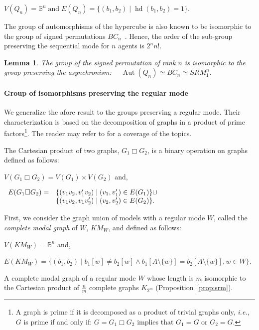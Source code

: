 \documentclass[12pt]{elsarticle}
\newtheorem{lemma}{Lemma}
\newcommand{\Bset}[0]{\mathbb{B}}
\newcommand{\abbrev}[1]{#1, \relax}
\newcommand{\ie}[0]{\abbrev{\textit{i.e.}}}
\newcommand{\aut}[0]{\operatorname{Aut}}
\begin{document}
\medskip
$ V(Q_n)=\Bset^n \;\text{and}\; E(Q_n)=\{(b_1,b_2) \mid \operatorname{hd}(b_1,b_2) = 1 \}.$

\medskip
The group of automorphisms of the hypercube is also known to be isomorphic to the group of signed permutations $BC_n$~\cite{Chen1993}. Hence, the order of the sub-group preserving the sequential mode for $n$ agents is $2^{n}n!$.
\begin{lemma} 
\label{lem:sequential-group}
The group of the signed permutation of rank $n$ is isomorphic to the group preserving the asynchronism: $\quad \aut(Q_n)\simeq BC_n \simeq SRM_1^n.$
\end{lemma}

\paragraph{Group of isomorphisms preserving the regular mode}
We generalize the afore result to the groups preserving a regular mode. Their characterization is based on the decomposition of graphs in a product of prime factors\footnote{A graph is prime if it is decomposed as a product of trivial graphs only, \ie $G$ is prime if and only if: $G = G_1 \Box G_2$ implies that $G_1=G$ or $G_2=G$.}.
 The reader may refer to \cite{Imrich2008, Hammack2011, Sabidussi1959} for a coverage of the topics.

The Cartesian product of two graphs, $G_1 \Box G_2$, is a binary operation on graphs defined as follows:

\medskip
\noindent
$V(G_1 \Box G_2) = V(G_1) \times V(G_2)$ and,

\noindent
$\begin{array}[t]{l l} 
E(G_1 \Box G_2)= &\{ ( v_1v_2,v_1'v_2) \mid (v_1,v_1') \in E(G_1) \} \cup \\		
 					 &\{ ( v_1v_2,v_1v_2') \mid (v_2,v_2') \in E(G_2) \}.
\end{array}$

\medskip

First, we consider the graph union of models with a regular mode $W$, called the \emph{complete modal graph} of $W$, $KM_W$, and defined as follows:

\medskip
\noindent
$V(KM_W)= \Bset^n$ and,

\noindent
$E(KM_W)=\{ (b_1,b_2) \mid b_1[w] \neq b_2[w] \wedge b_1[A \setminus \{w\}]= b_2[A \setminus \{w\}], w \in W \}$.

\medskip
A complete modal graph of a regular mode $W$ whose length is $m$ isomorphic to the Cartesian product of $\frac{n}{m}$ complete graphs $K_{2^m}$ (Proposition~\ref{prop:srm}). 
\end{document}
